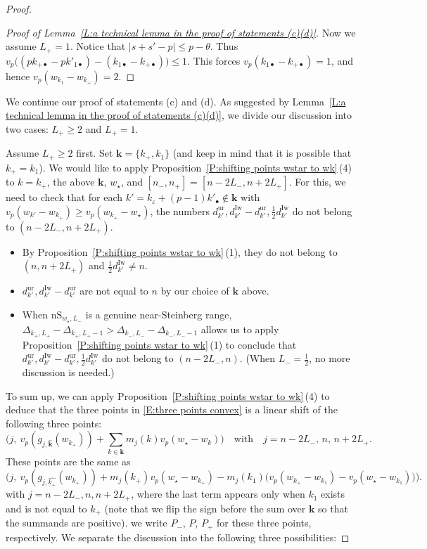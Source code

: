 \documentclass[12pt]{amsart}
\theoremstyle{definition}
\numberwithin{equation}{subsection}
\def\bfk{\mathbf{k}}
\newcommand{\Iw}{\mathrm{Iw}}
\newcommand{\unr}{\mathrm{ur}}
\newcommand{\nS}{\mathrm{nS}}
\begin{document}
\begin{proof}
\begin{proof}[Proof of Lemma~\ref{L:a technical lemma in the proof of statements (c)(d)}]
Now we assume $L_+=1$. Notice that $|s+s'-p|\leq p-\theta$. Thus $v_p\big( (pk_{+\bullet}-pk'_{1\bullet}) - (k_{1\bullet} - k_{+\bullet})\big) \leq 1$. This forces $v_p(k_{1\bullet}-k_{+\bullet})= 1$,  and hence $v_p(w_{k_1}-w_{k_+})=2$.
	
\end{proof}
\medskip
We continue our proof of statements (c) and (d). As suggested by Lemma~\ref{L:a technical lemma in the proof of statements (c)(d)}, we divide our discussion into two cases: $L_+\geq 2$ and $L_+=1$. 

Assume $L_+\geq 2$ first.
Set $\bfk = \{k_+,k_1\}$ (and keep in mind that it is possible that $k_+=k_1$).
We would like to apply Proposition~\ref{P:shifting points wstar to wk}\,(4) to  $k = k_+$, the above $\bfk$, $w_\star$, and $[n_-, n_+] = [n-2L_-, n+2L_+]$. For this, we need to check that for each $k' = k_\varepsilon + (p-1)k'_\bullet \notin \bfk$ with $v_p(w_{k'}-w_{k_+}) \geq v_p(w_{k_+}-w_\star)$, the numbers $d_{k'}^\unr, d_{k'}^{\Iw}-d_{k'}^{\unr}, \frac 12d_{k'}^\Iw$ do not belong to $(n-2L_-, n+2L_+)$. 
\begin{itemize}
\item 
By Proposition~\ref{P:shifting points wstar to wk}\,(1), they do not belong to $(n, n+2L_+)$ and $\frac 12d_{k'}^\Iw \neq n$.
\item
$d_{k'}^\unr, d_{k'}^{\Iw}-d_{k'}^{\unr}$ are not equal to $n$ by our choice of $\bfk$ above.
\item
When $\nS_{w_\star, L_-}$ is a genuine near-Steinberg range, $\Delta_{k_+, L_+} - \Delta_{k_+, L_+-1} > \Delta_{k_-, L_-} - \Delta_{k_-, L_--1}$ allows us to apply Proposition~\ref{P:shifting points wstar to wk}\,(1) to conclude that $d_{k'}^\unr, d_{k'}^{\Iw}-d_{k'}^{\unr}, \frac 12d_{k'}^\Iw$ do not belong to $(n-2L_-, n)$. 
(When $L_- = \frac 12$, no more discussion is needed.)
\end{itemize}

To sum up, we can apply Proposition~\ref{P:shifting points wstar to wk}\,(4)  to deduce that the three points in \eqref{E:three points convex} is a linear 
shift of the following three points:
$$
\Big( j,\ v_p(g_{j, \hat{\bfk}}(w_{k_+})) + \sum_{k \in \bfk} m_j(k) v_p(w_\star-w_k)\Big)\quad \textrm{with} \quad j= n-2L_-,\,n,\, n+2L_+.
$$
These points are the same as
\begin{equation}
\label{E:vertex three points after shift}\Big( j,\ v_p(g_{j, \hat{ k_+}}(w_{k_+})) + m_j(k_+)v_p(w_\star-w_{k_+}) - m_j(k_1)\big(v_p(w_{k_+}-w_{k_1})- v_p(w_\star-w_{k_1})  \big)\Big).
\end{equation}
with $j = n-2L_-, n, n+2L_+$, where the last term appears only when $k_1$ exists and is not equal to $k_+$ (note that we flip the sign before the sum over $\bfk$ so that the summands are positive). we write $P_-$, $P$, $P_+$ for these three points, respectively.
We separate the discussion into the following three possibilities:


\end{proof}
\end{document}
